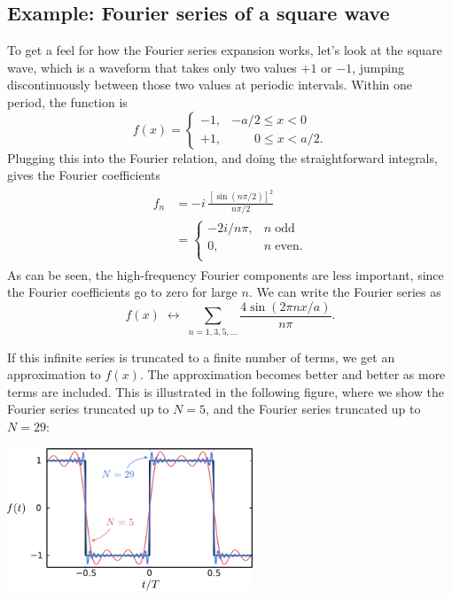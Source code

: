 \documentclass[10pt,a4paper]{article}
\begin{document}
\subsection{Example: Fourier series of a square wave}
\label{example-fourier-series-of-a-square-wave}

To get a feel for how the Fourier series expansion works, let's look
at the square wave, which is a waveform that takes only two values
$+1$ or $-1$, jumping discontinuously between those two values at
periodic intervals. Within one period, the function is
\begin{equation}
  f(x) = \left\{\begin{array}{ll}-1, & -a/2 \le x < 0
  \\ +1, & \quad\;\;\; 0 \le x < a/2.\end{array}\right.
\end{equation}
Plugging this into the Fourier relation, and doing the straightforward
integrals, gives the Fourier coefficients
\begin{align}
  \begin{aligned} f_n &= -i \, \frac{\left[\sin\left(n \pi/2\right)\right]^2}{n\pi/2 }
    \\ &= \left\{\begin{array}{cl} -2i/n\pi ,& n \; \mathrm{odd} \\ 0,& n \; \mathrm{even}.
    \\\end{array}\right.
  \end{aligned}
\end{align}
As can be seen, the high-frequency Fourier components are less
important, since the Fourier coefficients go to zero for large $n$. We
can write the Fourier series as
\begin{equation}
f(x) \; \leftrightarrow \; \sum_{n=1,3,5,\dots} \frac{4\sin(2\pi n x /
  a)}{n \pi}.
\end{equation}

If this infinite series is truncated to a finite number of terms, we
get an approximation to $f(x)$. The approximation becomes better and
better as more terms are included.  This is illustrated in the
following figure, where we show the Fourier series truncated up to $N
= 5$, and the Fourier series truncated up to $N= 29$:

\begin{center}
  \includegraphics[width=0.55\textwidth]{square_fourier}
\end{center}
    
\end{document}

